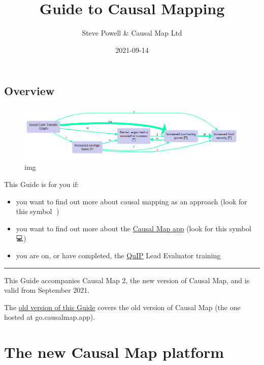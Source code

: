 \documentclass[
]{book}
\title{Guide to Causal Mapping}
\author{Steve Powell \& Causal Map Ltd}
\date{2021-09-14}
\providecommand{\tightlist}{%
  \setlength{\itemsep}{0pt}\setlength{\parskip}{0pt}}
\begin{document}
\maketitle

{
\setcounter{tocdepth}{1}
\tableofcontents
}
\hypertarget{overview}{%
\chapter{Overview}\label{overview}}

\begin{figure}
\centering
\includegraphics[width=7.29167in,height=\textheight]{_assets/simplify.png}
\caption{img}
\end{figure}

This Guide is for you if:

\begin{itemize}
\tightlist
\item
  you want to find out more about causal mapping as an approach (look for this symbol 🧠)
\item
  you want to find out more about the \href{https://causalmap.app/}{Causal Map app} (look for this symbol 💻)
\item
  you are on, or have completed, the \href{https://bathsdr.org/about-the-quip/}{QuIP} Lead Evaluator training
\end{itemize}

\begin{center}\rule{0.5\linewidth}{0.5pt}\end{center}

This Guide accompanies Causal Map 2, the new version of Causal Map, and is valid from September 2021.

The \href{http://guide2.causalmap.app.s3-website.eu-west-2.amazonaws.com/}{old version of this Guide} covers the old version of Causal Map (the one hosted at go.causalmap.app).

\hypertarget{part-the-new-causal-map-platform}{%
\part{The new Causal Map platform}\label{part-the-new-causal-map-platform}}
\end{document}
